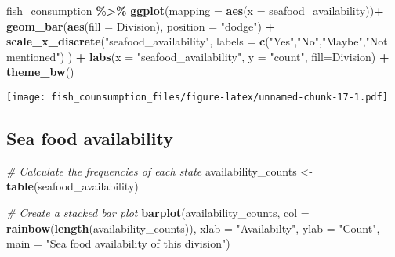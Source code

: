 \documentclass[
]{article}
\newenvironment{Shaded}{\begin{snugshade}}{\end{snugshade}}
\newcommand{\AttributeTok}[1]{\textcolor[rgb]{0.13,0.29,0.53}{#1}}
\newcommand{\CommentTok}[1]{\textcolor[rgb]{0.56,0.35,0.01}{\textit{#1}}}
\newcommand{\FunctionTok}[1]{\textcolor[rgb]{0.13,0.29,0.53}{\textbf{#1}}}
\newcommand{\NormalTok}[1]{#1}
\newcommand{\OtherTok}[1]{\textcolor[rgb]{0.56,0.35,0.01}{#1}}
\newcommand{\SpecialCharTok}[1]{\textcolor[rgb]{0.81,0.36,0.00}{\textbf{#1}}}
\newcommand{\StringTok}[1]{\textcolor[rgb]{0.31,0.60,0.02}{#1}}
\begin{document}
\begin{Shaded}
\begin{Highlighting}[]
\NormalTok{fish\_consumption }\SpecialCharTok{\%\textgreater{}\%}
\FunctionTok{ggplot}\NormalTok{(}\AttributeTok{mapping =} \FunctionTok{aes}\NormalTok{(}\AttributeTok{x =}\NormalTok{ seafood\_availability))}\SpecialCharTok{+}
\FunctionTok{geom\_bar}\NormalTok{(}\FunctionTok{aes}\NormalTok{(}\AttributeTok{fill =}\NormalTok{ Division), }\AttributeTok{position =} \StringTok{"dodge"}\NormalTok{) }\SpecialCharTok{+}
\FunctionTok{scale\_x\_discrete}\NormalTok{(}\StringTok{"seafood\_availability"}\NormalTok{, }\AttributeTok{labels =} \FunctionTok{c}\NormalTok{(}\StringTok{"Yes"}\NormalTok{,}\StringTok{"No"}\NormalTok{,}\StringTok{"Maybe"}\NormalTok{,}\StringTok{"Not mentioned"}\NormalTok{) ) }\SpecialCharTok{+}
\FunctionTok{labs}\NormalTok{(}\AttributeTok{x =} \StringTok{"seafood\_availability"}\NormalTok{, }\AttributeTok{y =} \StringTok{"count"}\NormalTok{, }\AttributeTok{fill=}\StringTok{\textquotesingle{}Division\textquotesingle{}}\NormalTok{) }\SpecialCharTok{+}
\FunctionTok{theme\_bw}\NormalTok{()}
\end{Highlighting}
\end{Shaded}

\texttt{[image: fish\_counsumption\_files/figure-latex/unnamed-chunk-17-1.pdf]}

\hypertarget{sea-food-availability}{%
\subsection{Sea food availability}\label{sea-food-availability}}

\begin{Shaded}
\begin{Highlighting}[]
\CommentTok{\# Calculate the frequencies of each state}
\NormalTok{availability\_counts }\OtherTok{\textless{}{-}} \FunctionTok{table}\NormalTok{(seafood\_availability)}

\CommentTok{\# Create a stacked bar plot}
\FunctionTok{barplot}\NormalTok{(availability\_counts, }\AttributeTok{col =} \FunctionTok{rainbow}\NormalTok{(}\FunctionTok{length}\NormalTok{(availability\_counts)), }
        \AttributeTok{xlab =} \StringTok{"Availabilty"}\NormalTok{, }\AttributeTok{ylab =} \StringTok{"Count"}\NormalTok{, }\AttributeTok{main =} \StringTok{"Sea food availability of this division"}\NormalTok{)}
\end{Highlighting}
\end{Shaded}
\end{document}
